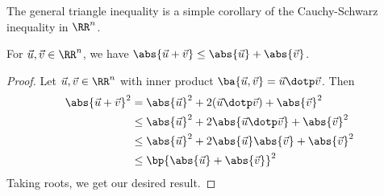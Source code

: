 The general triangle inequality is a simple corollary of the Cauchy-Schwarz inequality in $\RR^n$.

\begin{corollary}
    For $\vec u, \vec v \in \RR^n$, we have $\abs{\vec u + \vec v} \leq \abs{\vec u} + \abs{\vec v}$.
\end{corollary}
\begin{proof}
    Let $\vec u, \vec v \in \RR^n$ with inner product $\ba{\vec u, \vec v} = \vec u \dotp \vec v$. Then
    \begin{align*}
        \abs{\vec u + \vec v}^2 &= \abs{\vec u}^2 + 2(\vec u \dotp \vec v) + \abs{\vec v}^2\\
        &\leq \abs{\vec u}^2 + 2\abs{\vec u \dotp \vec v} + \abs{\vec v}^2\\
        &\leq \abs{\vec u}^2 + 2\abs{\vec u}\abs{\vec v} + \abs{\vec v}^2\\
        &\leq \bp{\abs{\vec u} + \abs{\vec v}}^2
    \end{align*}
    Taking roots, we get our desired result.
\end{proof}